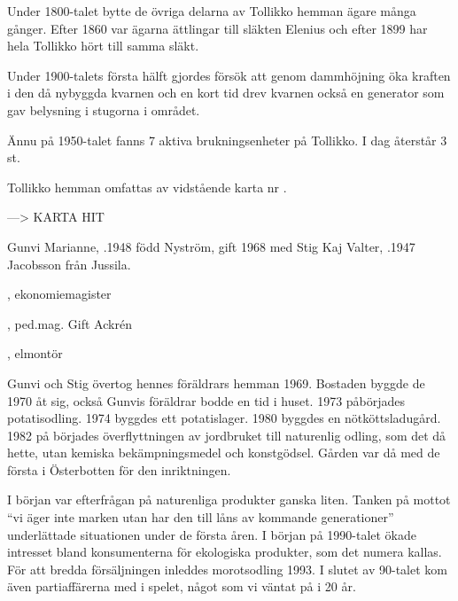 Under 1800-talet bytte de övriga delarna av Tollikko hemman ägare många gånger. Efter 1860 var ägarna ättlingar till släkten Elenius och efter 1899 har hela Tollikko hört till samma släkt.

Under 1900-talets första hälft gjordes försök att genom dammhöjning öka kraften i den då nybyggda kvarnen och en kort tid drev kvarnen också en generator som gav belysning i stugorna i området.

Ännu på 1950-talet fanns 7 aktiva brukningsenheter på Tollikko. I dag återstår 3 st.

Tollikko hemman omfattas av vidstående karta nr .


---> KARTA HIT








Gunvi Marianne, .1948 född Nyström, gift 1968 med Stig Kaj Valter, .1947 Jacobsson från Jussila.
\begin{jhchildren}
  \item {}, ekonomiemagister
  \item {}, ped.mag. Gift Ackrén
  \item {}, elmontör
\end{jhchildren}
Gunvi och Stig övertog hennes föräldrars hemman 1969. Bostaden 	byggde de 1970 åt sig, också Gunvis föräldrar bodde en tid i huset. 1973 påbörjades potatisodling. 1974 byggdes ett potatislager. 1980 byggdes en nötköttsladugård. 1982 på börjades överflyttningen av jordbruket till naturenlig odling, som det då hette, utan kemiska bekämpningsmedel och konstgödsel. Gården var då med de första i Österbotten för den inriktningen.

I början var efterfrågan på naturenliga produkter ganska liten. Tanken på mottot ``vi äger inte marken utan har den till låns av kommande generationer'' underlättade situationen under de första åren. I början på 1990-talet ökade intresset bland konsumenterna för ekologiska produkter, som det numera kallas. För att bredda försäljningen inleddes morotsodling 1993. I slutet av 90-talet kom även partiaffärerna med i spelet, något som vi väntat på i 20 år.

